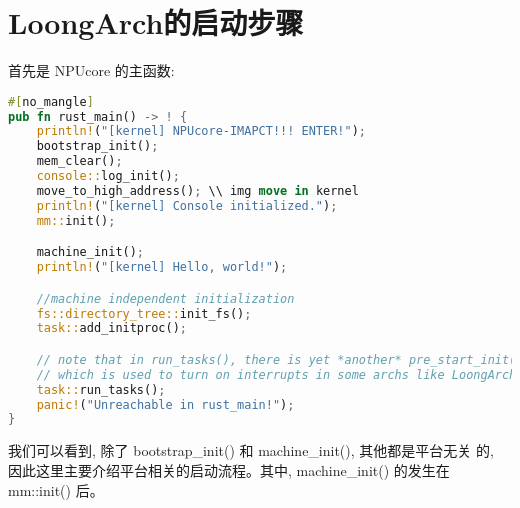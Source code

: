 \section{LoongArch的启动步骤}
首先是 NPUcore 的主函数:
\begin{lstlisting}[language={rust}, label={code:refill},
	caption={os/src/main.rs}]
#[no_mangle]
pub fn rust_main() -> ! {
    println!("[kernel] NPUcore-IMAPCT!!! ENTER!");
    bootstrap_init();
    mem_clear();
    console::log_init();
    move_to_high_address(); \\ img move in kernel
    println!("[kernel] Console initialized.");
    mm::init();

    machine_init();
    println!("[kernel] Hello, world!");

    //machine independent initialization
    fs::directory_tree::init_fs();
    task::add_initproc();

    // note that in run_tasks(), there is yet *another* pre_start_init(),
    // which is used to turn on interrupts in some archs like LoongArch.
    task::run_tasks();
    panic!("Unreachable in rust_main!");
}
\end{lstlisting}
我们可以看到, 除了 bootstrap_init() 和 machine_init(), 其他都是平台无关
的, 因此这里主要介绍平台相关的启动流程。其中, machine_init() 的发生在 mm::init() 后。

